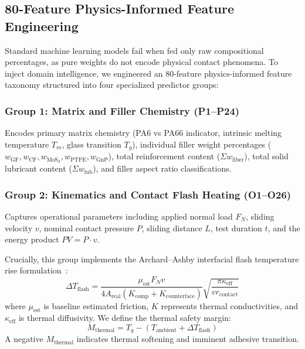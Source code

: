 \documentclass[10pt,twocolumn,a4paper]{article}
\begin{document}
\subsection{80-Feature Physics-Informed Feature Engineering}
Standard machine learning models fail when fed only raw compositional percentages, as pure weights do not encode physical contact phenomena. To inject domain intelligence, we engineered an 80-feature physics-informed feature taxonomy structured into four specialized predictor groups:

\subsubsection{Group 1: Matrix and Filler Chemistry (P1--P24)}
Encodes primary matrix chemistry (PA6 vs PA66 indicator, intrinsic melting temperature $T_m$, glass transition $T_g$), individual filler weight percentages ($w_{\text{GF}}, w_{\text{CF}}, w_{\text{MoS}_2}, w_{\text{PTFE}}, w_{\text{GnP}}$), total reinforcement content ($\Sigma w_{\text{fiber}}$), total solid lubricant content ($\Sigma w_{\text{lub}}$), and filler aspect ratio classifications.

\subsubsection{Group 2: Kinematics and Contact Flash Heating (O1--O26)}
Captures operational parameters including applied normal load $F_N$, sliding velocity $v$, nominal contact pressure $P$, sliding distance $L$, test duration $t$, and the energy product $PV = P \cdot v$.

Crucially, this group implements the Archard--Ashby interfacial flash temperature rise formulation~\cite{ashby1991wearmaps}:
\begin{equation}
    \Delta T_{\text{flash}} = \frac{\mu_{\text{est}} F_N v}{4 A_{\text{real}} (K_{\text{comp}} + K_{\text{counterface}})} \sqrt{\frac{\pi \kappa_{\text{eff}}}{v r_{\text{contact}}}}
    \label{eq:flash_temp}
\end{equation}
where $\mu_{\text{est}}$ is baseline estimated friction, $K$ represents thermal conductivities, and $\kappa_{\text{eff}}$ is thermal diffusivity. We define the thermal safety margin:
\begin{equation}
    M_{\text{thermal}} = T_g - (T_{\text{ambient}} + \Delta T_{\text{flash}})
    \label{eq:thermal_margin}
\end{equation}
A negative $M_{\text{thermal}}$ indicates thermal softening and imminent adhesive transition.
\end{document}
